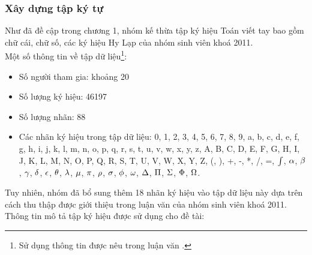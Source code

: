 \documentclass[a4paper]{article}
\theoremstyle{definition}
\begin{document}
	\subsubsection{Xây dựng tập ký tự}
	Như đã đề cập trong chương 1, nhóm kế thừa tập ký hiệu Toán viết tay bao gồm chữ cái, chữ số, các ký hiệu Hy Lạp của nhóm sinh viên khoá 2011\cite{qak}.\\
	Một số thông tin về tập dữ liệu\footnote{Sử dụng thông tin được nêu trong luận văn \cite{qak}.}:
	\begin{itemize}
		\item Số người tham gia: khoảng 20
		\item Số lượng ký hiệu: 46197
		\item Số lượng nhãn: 88
		\item Các nhãn ký hiệu trong tập dữ liệu: 0, 1, 2, 3, 4, 5, 6, 7, 8, 9, a, b, c, d, e, f, g, h, i,
		j, k, l, m, n, o, p, q, r, s, t, u, v, w, x, y, z, A, B, C, D, E, F, G, H, I, J, K, L, M, N, O, P, Q, R, S, T, U, V, W, X, Y, Z, (, ), +, -, *, /, =,  $\textcolor{black}{\int}$, $\textcolor{black}{\alpha}$, $\textcolor{black}{\beta}$, $\textcolor{black}{\gamma}$, $\textcolor{black}{\delta}$, $\textcolor{black}{\epsilon}$, $\textcolor{black}{\theta}$, $\textcolor{black}{\lambda}$, $\textcolor{black}{\mu}$, $\textcolor{black}{\pi}$, $\textcolor{black}{\rho}$, $\textcolor{black}{\sigma}$, $\textcolor{black}{\phi}$, $\textcolor{black}{\omega}$, $\textcolor{black}{\Delta}$, $\textcolor{black}{\Pi}$, $\textcolor{black}{\Sigma}$, $\textcolor{black}{\Phi}$, $\textcolor{black}{\Omega}$.
	\end{itemize}
	Tuy nhiên, nhóm đã bổ sung thêm 18 nhãn ký hiệu vào tập dữ liệu này dựa trên cách thu thập được giới thiệu trong luận văn của nhóm sinh viên khoá 2011\cite{qak}.\\
	Thông tin mô tả tập ký hiệu được sử dụng cho đề tài:
\end{document}
